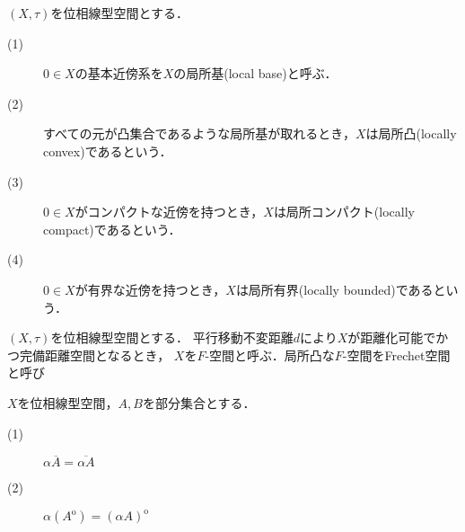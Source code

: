 	\begin{screen}
		\begin{dfn}
			$(X,\tau)$を位相線型空間とする．
			\begin{description}
				\item[(1)] $0 \in X$の基本近傍系を$X$の局所基(local base)と呼ぶ．
				\item[(2)] すべての元が凸集合であるような局所基が取れるとき，$X$は局所凸(locally convex)であるという．
				\item[(3)] $0 \in X$がコンパクトな近傍を持つとき，$X$は局所コンパクト(locally compact)であるという．
				\item[(4)] $0 \in X$が有界な近傍を持つとき，$X$は局所有界(locally bounded)であるという．
			\end{description}
		\end{dfn}
	\end{screen}
	
	\begin{screen}
		\begin{dfn}
			$(X,\tau)$を位相線型空間とする．
			平行移動不変距離$d$により$X$が距離化可能でかつ完備距離空間となるとき，
			$X$を$F$-空間と呼ぶ．局所凸な$F$-空間をFrechet空間と呼び
		\end{dfn}
	\end{screen}
	
	\begin{screen}
		\begin{thm}
			$X$を位相線型空間，$A,B$を部分集合とする．
			\begin{description}
				\item[(1)] $\alpha \overline{A} = \overline{\alpha A}$
				\item[(2)] $\alpha (A^{\mathrm{o}}) = (\alpha A)^{\mathrm{o}}$
			\end{description}
		\end{thm}
	\end{screen}
	
